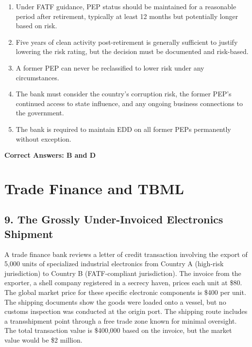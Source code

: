 \documentclass[11pt,a4paper]{article}
\begin{document}
	\begin{enumerate}[label=\Alph*.]
		\item Under FATF guidance, PEP status should be maintained for a reasonable period after retirement, typically at least 12 months but potentially longer based on risk.
		\item Five years of clean activity post-retirement is generally sufficient to justify lowering the risk rating, but the decision must be documented and risk-based.
		\item A former PEP can never be reclassified to lower risk under any circumstances.
		\item The bank must consider the country's corruption risk, the former PEP's continued access to state influence, and any ongoing business connections to the government.
		\item The bank is required to maintain EDD on all former PEPs permanently without exception.
	\end{enumerate}
	
	\textbf{Correct Answers: B and D}
	
	\section{Trade Finance and TBML}
	
	\subsection{9. The Grossly Under-Invoiced Electronics Shipment}
	
	A trade finance bank reviews a letter of credit transaction involving the export of 5,000 units of specialized industrial electronics from Country A (high-risk jurisdiction) to Country B (FATF-compliant jurisdiction). The invoice from the exporter, a shell company registered in a secrecy haven, prices each unit at \$80. The global market price for these specific electronic components is \$400 per unit. The shipping documents show the goods were loaded onto a vessel, but no customs inspection was conducted at the origin port. The shipping route includes a transshipment point through a free trade zone known for minimal oversight. The total transaction value is \$400,000 based on the invoice, but the market value would be \$2 million.
	
\end{document}

